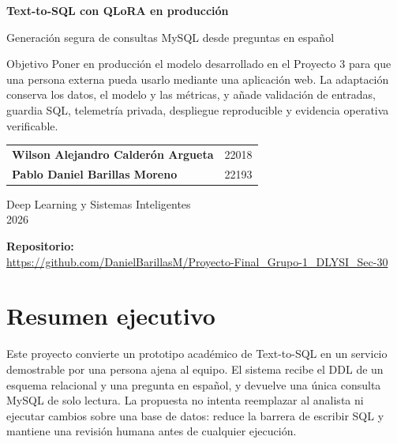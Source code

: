 \documentclass[11pt,letterpaper]{article}
\begin{document}
\color{ink}

\begin{titlepage}
\vspace*{1cm}
\par\vspace{.25cm}
\noindent{\color{teal}\rule{\textwidth}{2pt}\par}
\vspace{1.5cm}
{\Huge\bfseries Text-to-SQL con QLoRA en producción\par}
\vspace{.35cm}
{\Large Generación segura de consultas MySQL desde preguntas en español\par}
\vspace{1.2cm}

\begin{resultado}{Objetivo}
Poner en producción el modelo desarrollado en el Proyecto 3 para que una persona externa pueda
usarlo mediante una aplicación web. La adaptación conserva los datos, el modelo y las métricas,
y añade validación de entradas, guardia SQL, telemetría privada, despliegue reproducible y evidencia
operativa verificable.
\end{resultado}

\vfill
\begin{tabular}{@{}ll@{}}
\textbf{Wilson Alejandro Calderón Argueta} & 22018\\
\textbf{Pablo Daniel Barillas Moreno} & 22193
\end{tabular}
\vspace{.8cm}

Deep Learning y Sistemas Inteligentes\\
2026
\vspace{.35cm}

\small\textbf{Repositorio:}\\
\url{https://github.com/DanielBarillasM/Proyecto-Final_Grupo-1_DLYSI_Sec-30}
\end{titlepage}

\tableofcontents
\clearpage

\section{Resumen ejecutivo}

Este proyecto convierte un prototipo académico de Text-to-SQL en un servicio demostrable por una
persona ajena al equipo. El sistema recibe el DDL de un esquema relacional y una pregunta en español,
y devuelve una única consulta MySQL de solo lectura. La propuesta no intenta reemplazar al analista
ni ejecutar cambios sobre una base de datos: reduce la barrera de escribir SQL y mantiene una revisión
humana antes de cualquier ejecución.
\end{document}
